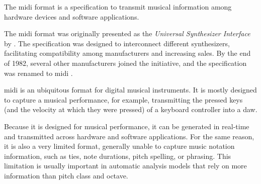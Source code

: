 


The \gls{midi} format is a
specification to transmit musical information among hardware
devices and software applications.

The \gls{midi} format was originally presented as the
\emph{Universal Synthesizer Interface} by
\textcite{smith1981usi}. The specification was
designed to interconnect different synthesizers,
facilitating compatibility among manufacturers and
increasing sales. By the end of 1982, several other
manufacturers joined the initiative, and the specification
was renamed to \gls{midi} \parencite{moog1986midi}.


\gls{midi} is an ubiquitous format for digital musical instruments. It is mostly designed to capture a musical performance, for example, transmitting the pressed keys (and the velocity at which they were pressed) of a keyboard controller into a \gls{daw}.

Because it is designed for musical performance, it can be generated in real-time and transmitted across hardware and software applications. For the same reason, it is also a very limited format, generally unable to capture music notation information, such as ties, note durations, pitch spelling, or phrasing. This limitation is usually important in automatic analysis models that rely on more information than pitch class and octave.


